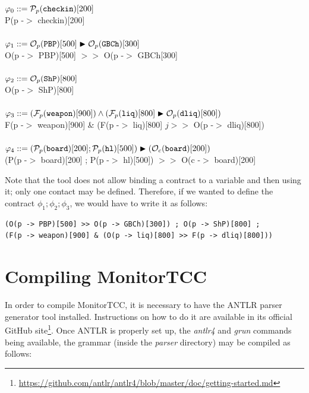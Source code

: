 \documentclass{article}
\begin{document}
\small
\noindent
    $\varphi_0 ::= {\mathcal{P}_{p}(\mathtt{checkin})}[200]$\\
    P(p -$>$ checkin)[200] \\
    \\
    $\varphi_1 ::= {\mathcal{O}_{p}(\mathtt{PBP})}[500]\blacktriangleright {\mathcal{O}_{p}(\ensuremath{\mathtt{GBCh}})}[300]$\\
    O(p -$>$ PBP)[500] $>>$ O(p -$>$ GBCh[300] \\
    \\
    $\varphi_2 ::= {\mathcal{O}_{p}(\mathtt{ShP})}[800]$\\
    O(p -$>$ ShP)[800] \\
    \\
    $\varphi_3  ::= 
        ({\mathcal{F}_{p}(\mathtt{weapon})}[900]) \wedge ({\mathcal{F}_{p}(\mathtt{liq})}[800] \blacktriangleright {\mathcal{O}_{p}(\ensuremath{\mathtt{dliq}})}[800])$\\
            F(p -$>$ weapon)[900] \& (F(p -$>$ liq)[800] $j>>$ O(p -$>$ dliq)[800]) \\
            \\
    $\varphi_4 ::= ({\mathcal{P}_{p}(\mathtt{board})}[200] ; {\mathcal{P}_{p}(\mathtt{hl})}[500]) \blacktriangleright ({\mathcal{O}_{c}(\mathtt{board})}[200])$ \\
    (P(p -$>$ board)[200] ; P(p -$>$ hl)[500]) $>>$ O(c -$>$ board)[200]
    \\
\normalsize

Note that the tool does not allow binding a contract to a variable and then using it; only one contact may be defined. Therefore, if we wanted to define the contract $\phi_1 ; \phi_2 ; \phi_3$, we would have to write it as follows:

\small

\begin{verbatim}
(O(p -> PBP)[500] >> O(p -> GBCh)[300]) ; O(p -> ShP)[800] ; 
(F(p -> weapon)[900] & (O(p -> liq)[800] >> F(p -> dliq)[800]))
\end{verbatim}

\normalsize

\section{Compiling MonitorTCC}

In order to compile MonitorTCC, it is necessary to have the ANTLR parser generator tool installed. Instructions on how to do it are available in its official GitHub site\footnote{\url{https://github.com/antlr/antlr4/blob/master/doc/getting-started.md}}. Once ANTLR is properly set up, the \textit{antlr4} and \textit{grun} commands being available, the grammar (inside the \textit{parser} directory) may be compiled as follows:
\end{document}

